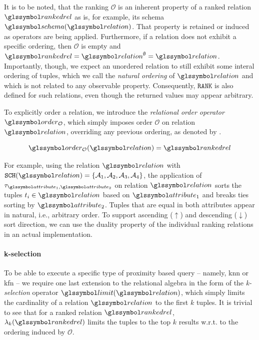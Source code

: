It is to be noted, that the ranking $\mathcal{O}$ is an inherent property of a ranked relation $\rankedrel$ as is, for example, its schema $\schema(\relation)$. That property is retained or induced as operators are being applied. Furthermore, if a relation does not exhibit a specific ordering, then $\mathcal{O}$ is empty and $\rankedrel = \relation^{\emptyset} = \relation$. Importantly, though, we expect an unordered relation to still exhibit some interal ordering of tuples, which we call the \emph{natural ordering} of $\relation$ and which is not related to any observable property. Consequently, $\mathtt{RANK}$ is also defined for such relations, even though the returned values may appear arbitrary.

To explicitly order a relation, we introduce the \emph{relational order operator} $\order_{\mathcal{O}}$, which simply imposes order $\mathcal{O}$ on relation $\relation$, overriding any previous ordering, as denoted by .

\begin{equation}
    \label{equation:rel_alg_tau}
    \order_{\mathcal{O}}(\relation) = \rankedrel
\end{equation}

For example, using the relation $\relation$ with $\mathtt{SCH}(\relation) = \{ \mathcal{A}_1, \mathcal{A}_2, \mathcal{A}_3, \mathcal{A}_4 \}$, the application of $\tau_{\attribute_1,\attribute_2}$ on relation $\relation$ sorts the tuples $t_i \in \relation$ based on $\attribute_1$ and breaks ties sorting by $\attribute_2$. Tuples that are equal in both attributes appear in natural, i.e., arbitrary order. To support ascending ($\uparrow$) and descending  ($\downarrow$) sort direction, we can use the duality property of the individual ranking relations in an actual implementation.

\paragraph{k-selection}

To be able to execute a specific type of proximity based query -- namely, \acrshort{knn} or \acrshort{kfn} -- we require one last extension to the relational algebra in the form of the \emph{k-selection} operator $\limit(\relation)$, which simply limits the cardinality of a relation $\relation$ to the first $k$ tuples. It is trivial to see that for a ranked relation $\rankedrel$, $\lambda_k(\rankedrel)$ limits the tuples to the top $k$ results w.r.t. to the ordering induced by $\mathcal{O}$.

